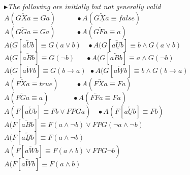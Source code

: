 \documentclass{article}
\begin{document}
\begin{multicols}{4}
$\blacktriangleright $\textit{The following are initially but not generally valid} \\
$A(G\overleftarrow{X}a \equiv Ga)\ \ \ \ \ \ \ \ \ \ \ \ \ \bullet A(G\overleftarrow{\underline{X}}a \equiv false)$ \\
$A(G\overleftarrow{G}a \equiv Ga)\ \ \ \ \ \ \ \ \ \ \ \ \ \bullet A(G\overleftarrow{F}a \equiv a)$ \\
$A(G[a \overleftarrow{U} b] \equiv G(a \vee b)\ \ \ \ \bullet A(G[a \overleftarrow{\underline{U}} b] \equiv b \wedge G(a \vee b) $ \\
$A(G[a \overleftarrow{B} b] \equiv G(\neg b)\ \ \ \ \ \ \ \bullet A(G[a \overleftarrow{\underline{B}} b] \equiv a \wedge G(\neg b) $ \\
$A(G[a \overleftarrow{W} b] \equiv G(b \rightarrow a)\ \ \bullet A(G[a \overleftarrow{\underline{W}} b] \equiv b \wedge G(b \rightarrow a) $ \\
$A(F\overleftarrow{X}a \equiv true)\ \ \ \ \ \ \ \ \ \ \ \bullet A(F\overleftarrow{\underline{X}}a \equiv Fa)$ \\
$A(F\overleftarrow{G}a \equiv a)\ \ \ \ \ \ \ \ \ \ \ \ \ \ \ \bullet A(F\overleftarrow{F}a \equiv Fa)$ \\
$A(F[a \overleftarrow{U} b] \equiv Fb \vee FPGa)\ \ \ \ \bullet A(F[a \overleftarrow{\underline{U}} b] \equiv Fb)$ \\
$A(F[a \overleftarrow{B} b] \equiv F(a \wedge \neg b) \vee FPG(\neg a \wedge \neg b)$ \\
$A(F[a \overleftarrow{\underline{B}} b] \equiv F(a \wedge \neg b)$ \\
$A(F[a \overleftarrow{W} b] \equiv F(a \wedge b) \vee FPG\neg b)$ \\
$A(F[a \overleftarrow{\underline{W}} b] \equiv F(a \wedge b)$ \\ 


\end{multicols}
\end{document}

